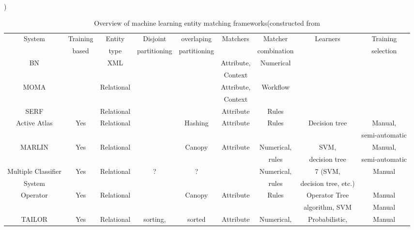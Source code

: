 \begin{table}
\caption{Overview of machine learning entity matching frameworks(constructed from \cite{KoRa10}})
\centering %
\begin{tabular}{|c|c|c|c|c|c|c|c|c|} %
\hline\hline %
System	&	Training	&	Entity	&	Disjoint	&	overlaping	&	Matchers	&	Matcher	&	Learners	&	Training	\\ [0.1ex]
	&	based	&	type	&	partitioning	&	partitioning	&		&	combination	&		&	selection	\\ [0.1ex]
\hline %
\hline %
BN \cite{LCWe07}	&		&	XML	&		&		&	Attribute, 	&	Numerical	&		&		\\ [0.1ex]
	&		&		&		&		&	Context	&		&		&		\\ [0.1ex]
\hline																	
 MOMA \cite{ThRa07}	&		&	Relational	&		&		&	Attribute, 	&	 Workflow	&		&		\\ [0.1ex]
	&		&		&		&		&	Context	&		&		&		\\ [0.1ex]
\hline																	
SERF \cite{BGM*09}	&		&	Relational	&		&		&	Attribute 	&	Rules 	&		&		\\ [0.1ex]
\hline																	
Active Atlas \cite{TKMi02}	&	Yes	&	Relational	&		&	Hashing	&	Attribute 	&	Rules 	&	Decision tree	&	Manual, 	\\ [0.1ex]
	&		&		&		&		&		&		&		&	semi-automatic	\\ [0.1ex]
\hline																	
MARLIN \cite{BiMo03}	&	Yes	&	Relational	&		&	Canopy	&	Attribute 	&	Numerical,	&	SVM, 	&	Manual, 	\\ [0.1ex]
	&		&		&		&		&		&	rules	&	decision tree	&	semi-automatic	\\ [0.1ex]
\hline																	
 Multiple Classifier	&	Yes	&	Relational	&	?	&	?	&		&	Numerical,	&	7 (SVM, 	&	Manual	\\ [0.1ex]
System \cite{ZhRa05}	&		&		&		&		&		&	rules	&	decision tree, etc.)	&		\\ [0.1ex]
\hline																	
Operator \cite{CCG*07}	&	Yes	&	Relational	&		&	Canopy	&	Attribute 	&	Rules 	&	Operator Tree 	&	Manual	\\ [0.1ex]
	&		&		&		&		&		&		&	algorithm, SVM	&	Manual	\\ [0.1ex]
\hline																	
TAILOR \cite{EVEl02}	&	Yes	&	Relational	&	sorting, 	&	sorted 	&	Attribute 	&	Numerical, 	&	Probabilistic,	&	Manual	\\ [0.1ex]

\end{tabular}
\end{table}
